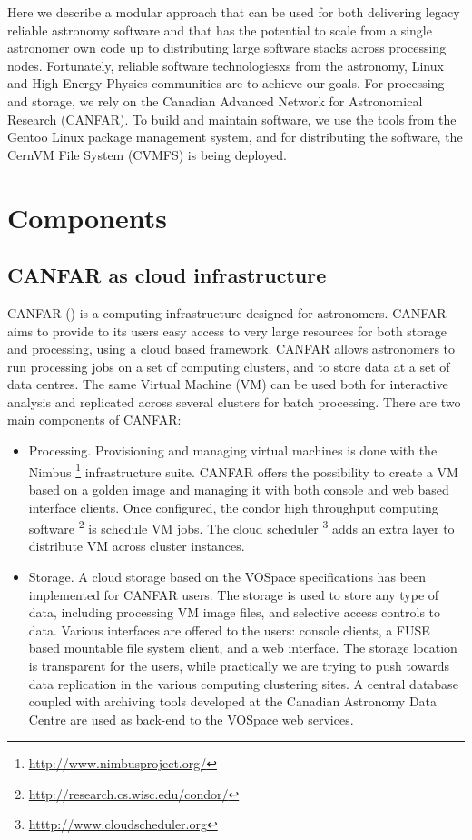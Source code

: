 Here we describe a modular approach that can be used for both
delivering legacy reliable astronomy software and that has the potential
to scale from a single astronomer own code up to distributing large
software stacks across processing nodes. Fortunately, reliable
software technologiesxs from the astronomy,
Linux and High Energy Physics communities are to achieve our goals. For
processing and storage, we rely on the Canadian Advanced Network for
Astronomical Research (CANFAR). To build and maintain software, we use the tools
from the Gentoo Linux package management system, and for distributing the
software, the CernVM File System (CVMFS) is being deployed.

\section{Components}
\subsection{CANFAR as cloud infrastructure}
CANFAR (\cite{canfar}) is a computing infrastructure designed for
astronomers. CANFAR aims to provide to its users easy access to very
large resources for both storage and processing, using a cloud based
framework. CANFAR allows astronomers to run processing jobs on a set
of computing clusters, and to store data at a set of data centres. The
same Virtual Machine (VM) can be used both for interactive analysis
and replicated across several clusters for batch processing.
There are two main components of CANFAR:
\begin{itemize}
\item Processing. Provisioning and managing virtual machines is done
  with the Nimbus \footnote{\url{http://www.nimbusproject.org/}}
  infrastructure suite. CANFAR offers the possibility
  to create a VM based on a golden image and managing it with both
  console and web based interface clients. Once configured,
  the condor high throughput computing software \footnote{\url{http://research.cs.wisc.edu/condor/}} is
  schedule VM jobs. The cloud scheduler \footnote{\url{htttp://www.cloudscheduler.org}} adds
  an extra layer to distribute VM across cluster instances.
\item Storage. A cloud storage based on the VOSpace specifications has
  been implemented for CANFAR users. The storage is used to store any
  type of data, including processing VM image files, and selective
  access controls to data. Various interfaces are offered to the
  users: console clients, a FUSE based mountable file system client,
  and a web interface. The storage location is transparent for
  the users, while practically we are trying to push towards data
  replication in the various computing clustering sites. A central
  database coupled with archiving tools developed at the Canadian
  Astronomy Data Centre are used as back-end to the VOSpace web services.
\end{itemize}

